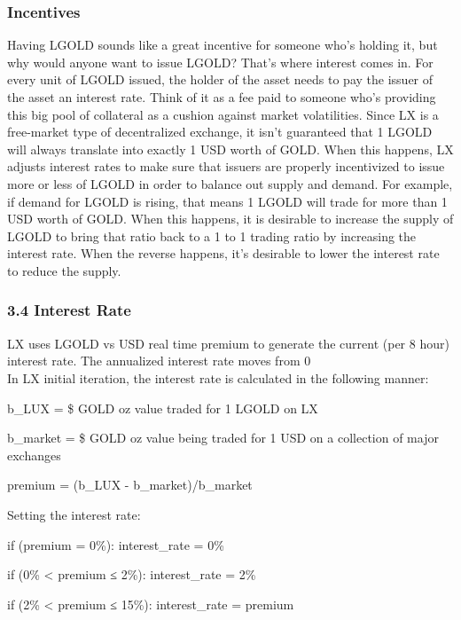 \documentclass[11pt]{article}
\begin{document}
\subsubsection{Incentives}

Having LGOLD sounds like a great incentive for someone who's holding it, but why would anyone want to issue LGOLD? That's where interest comes in. For every unit of LGOLD issued, the holder of the asset needs to pay the issuer of the asset an interest rate. Think of it as a fee paid to someone who's providing this big pool of collateral as a cushion against market volatilities. Since LX is a free-market type of decentralized exchange, it isn't guaranteed that 1 LGOLD will always translate into exactly 1 USD worth of GOLD. When this happens, LX adjusts interest rates to make sure that issuers are properly incentivized to issue more or less of LGOLD in order to balance out supply and demand. For example, if demand for LGOLD is rising, that means 1 LGOLD will trade for more than 1 USD worth of GOLD. When this happens, it is desirable to increase the supply of LGOLD to bring that ratio back to a 1 to 1 trading ratio by increasing the interest rate. When the reverse happens, it's desirable to lower the interest rate to reduce the supply.


\subsubsection{3.4 Interest Rate}

LX uses LGOLD vs USD real time premium to generate the current (per 8 hour) interest rate. The annualized interest rate moves from 0\\%


In LX initial iteration, the interest rate is calculated in the following manner:


b\_LUX = \$ GOLD oz value traded for 1 LGOLD on LX


b\_market = \$ GOLD oz value being traded for 1 USD on a collection of major exchanges


premium = (b\_LUX - b\_market)/b\_market


Setting the interest rate:


if (premium = 0\%): interest\_rate = 0\%


if (0\% < premium ≤ 2\%): interest\_rate = 2\%


if (2\% < premium ≤ 15\%): interest\_rate = premium
\end{document}
